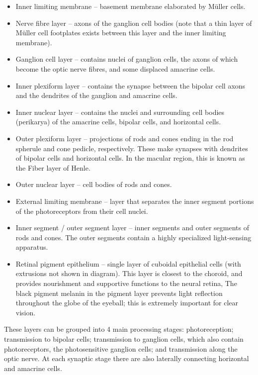 \begin{itemize}
\tightlist
\item
  Inner limiting membrane -- basement membrane elaborated by Müller cells.
\item
  Nerve fibre layer -- axons of the ganglion cell bodies (note that a thin layer of Müller cell footplates exists between this layer and the inner limiting membrane).
\item
  Ganglion cell layer -- contains nuclei of ganglion cells, the axons of which become the optic nerve fibres, and some displaced amacrine cells.
\item
  Inner plexiform layer -- contains the synapse between the bipolar cell axons and the dendrites of the ganglion and amacrine cells.
\item
  Inner nuclear layer -- contains the nuclei and surrounding cell bodies (perikarya) of the amacrine cells, bipolar cells, and horizontal cells.
\item
  Outer plexiform layer -- projections of rods and cones ending in the rod spherule and cone pedicle, respectively. These make synapses with dendrites of bipolar cells and horizontal cells. In the macular region, this is known as the Fiber layer of Henle.
\item
  Outer nuclear layer -- cell bodies of rods and cones.
\item
  External limiting membrane -- layer that separates the inner segment portions of the photoreceptors from their cell nuclei.
\item
  Inner segment / outer segment layer -- inner segments and outer segments of rods and cones. The outer segments contain a highly specialized light-sensing apparatus.
\item
  Retinal pigment epithelium -- single layer of cuboidal epithelial cells (with extrusions not shown in diagram). This layer is closest to the choroid, and provides nourishment and supportive functions to the neural retina, The black pigment melanin in the pigment layer prevents light reflection throughout the globe of the eyeball; this is extremely important for clear vision.
\end{itemize}

These layers can be grouped into 4 main processing stages: photoreception; transmission to bipolar cells; transmission to ganglion cells, which also contain photoreceptors, the photosensitive ganglion cells; and transmission along the optic nerve. At each synaptic stage there are also laterally connecting horizontal and amacrine cells.


